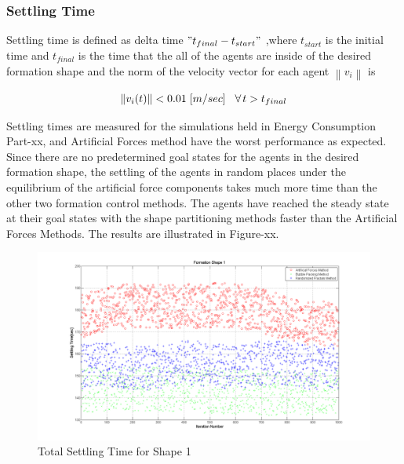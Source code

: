 \documentclass[twoside]{article}
\newcommand{\norm}[1]{\left\lVert#1\right\rVert}
\begin{document}
		
		
		
		  \subsubsection{Settling Time} 
		
		Settling time is defined as delta time $"t_{final} - t_{start}"$ ,where $t_{start}$ is the initial time and $t_{final}$ is the time that the all of the agents are inside of the desired formation shape and the norm of the velocity vector for each agent $\norm{v_i}$ is
		
		\begin{equation}
\norm{v_i(t)} < 0.01 \hspace{0.1cm} [m/sec] \hspace{0.3cm}\forall\hspace{0.05cm} t>t_{final}
		\end{equation}
		
		Settling times are measured for the simulations held in Energy Consumption Part-xx, and Artificial Forces method have the worst performance as expected. Since there are no predetermined goal states for the agents in the desired formation shape, the settling of the agents in random places under the equilibrium of the artificial force components takes much more time than the other two formation control methods. The agents have reached the steady state at their goal states with the shape partitioning methods faster than the Artificial Forces Methods. The results are illustrated in Figure-xx.
		
		   \begin{figure}[H]
		   	\caption{Total Settling Time for Shape 1}
		   	\centerline{\includegraphics[scale = 0.35]{Total_Time_Shape_1}}
		   \end{figure} 
		
\end{document}
